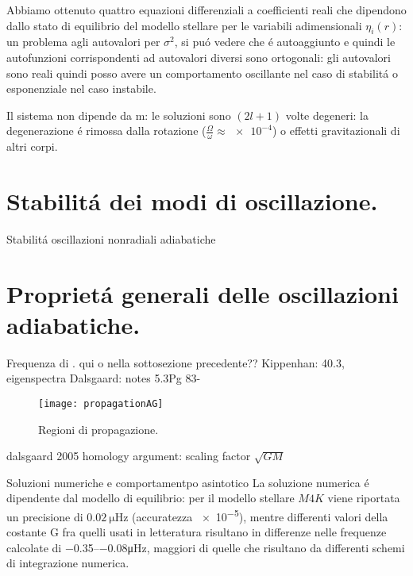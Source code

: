 \documentclass[oneside,12pt,fleqn]{memoir}
\begin{document}
Abbiamo ottenuto quattro equazioni differenziali a coefficienti reali che dipendono dallo stato di equilibrio del modello stellare per le variabili adimensionali $\eta_i(r)$: un problema agli autovalori per $\sigma^2$, si pu\'o vedere che \'e autoaggiunto e quindi le autofunzioni corrispondenti ad autovalori diversi sono ortogonali: gli autovalori sono reali quindi posso avere un comportamento oscillante nel caso di stabilit\'a o esponenziale nel caso instabile.

Il sistema non dipende da m: le soluzioni sono $(2l+1)$ volte degeneri: la degenerazione \'e rimossa dalla rotazione ($\frac{\Omega}{\omega}\approx\num{e-4}$) o effetti gravitazionali di altri corpi.


\section{Stabilit\'a dei modi di oscillazione.}

\begin{todo}{Stabilit\'a oscillazioni nonradiali adiabatiche}

\end{todo}

\section{Propriet\'a generali delle oscillazioni adiabatiche.}

\begin{todo}{Frequenza di \bv{}.}
qui o nella sottosezione precedente??
Kippenhan: 40.3, eigenspectra
Dalsgaard: notes 5.3Pg 83-
\end{todo}

\begin{figure}[!ht]
\centering
\texttt{[image: propagationAG]}
\caption{Regioni di propagazione.}
\end{figure}


\begin{todo}{dalsgaard 2005}
homology argument: scaling factor $\sqrt{GM}$
\end{todo}


\begin{todo}{Soluzioni numeriche e comportamentpo asintotico}
La soluzione numerica \'e dipendente dal modello di equilibrio: per il modello stellare $M4K$ viene riportata un precisione di $\SI{0.02}{\micro\hertz}$ (accuratezza \num{e-5}), mentre differenti valori della costante G fra quelli usati in letteratura risultano in differenze nelle frequenze calcolate di \numrange{-0.35}{-0.08}\si{\micro\hertz}, maggiori di quelle che risultano da differenti schemi di integrazione numerica.
\end{todo}
\end{document}

